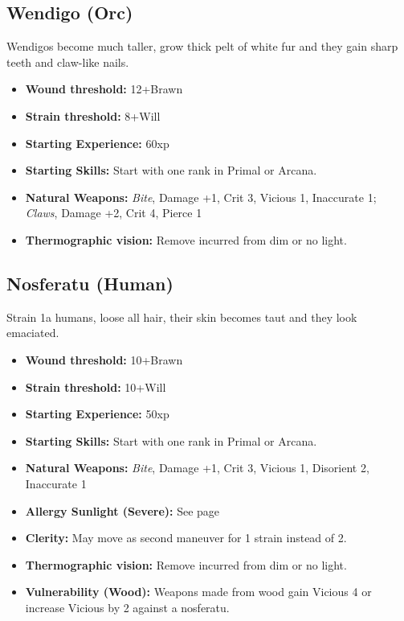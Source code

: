 \documentclass{book}
\begin{document}
\begin{multicols}{2}
	\subsection{Wendigo (Orc)}
	Wendigos become much taller, grow thick pelt of white fur and they gain sharp teeth and claw-like nails. 
	
	\begin{itemize}
		\item \textbf{Wound threshold:} 12+Brawn
		\item \textbf{Strain threshold:} 8+Will
		\item \textbf{Starting Experience:} 60xp
		\item \textbf{Starting Skills:} Start with one rank in Primal or Arcana.
		\item \textbf{Natural Weapons:} \textit{Bite}, Damage +1, Crit 3, Vicious 1, Inaccurate 1; \textit{Claws}, Damage +2, Crit 4, Pierce 1
		\item \textbf{Thermographic vision:} Remove \SetbackDie \SetbackDie incurred from dim or no light.
	\end{itemize}
	
	\subsection{Nosferatu (Human)}
	Strain 1a humans, loose all hair, their skin becomes taut and they look emaciated.
	
	\begin{itemize}
		\item \textbf{Wound threshold:} 10+Brawn
		\item \textbf{Strain threshold:} 10+Will
		\item \textbf{Starting Experience:} 50xp
		\item \textbf{Starting Skills:} Start with one rank in Primal or Arcana.
		\item \textbf{Natural Weapons:} \textit{Bite}, Damage +1, Crit 3, Vicious 1, Disorient 2,  Inaccurate 1
		\item \textbf{Allergy Sunlight (Severe):} See page \pageref{allergysunlight} 
		\item \textbf{Clerity:} May move as second maneuver for 1 strain instead of 2.	
		\item \textbf{Thermographic vision:} Remove \SetbackDie \SetbackDie incurred from dim or no light.
		\item \textbf{Vulnerability (Wood):} Weapons made from wood gain Vicious 4 or increase Vicious by 2 against a nosferatu.
	\end{itemize}
		


\end{multicols}
\end{document}
